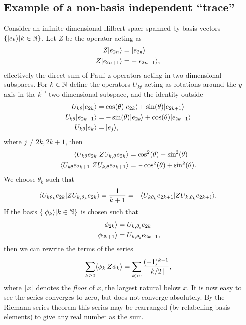\begin{subappendices}
\section{Example of a non-basis independent ``trace''}\label{app:bad-sum-is-bad}
Consider an infinite dimensional Hilbert space spanned by basis vectors $\left\{| e_k \rangle\middle|k\in\mathbb{N}\right\}$. Let $Z$ be the operator acting as
\begin{align}
  Z| e_{2n} \rangle &= | e_{2n} \rangle\\
  Z| e_{2n+1} \rangle &= -| e_{2n+1} \rangle,
\end{align}
effectively the direct sum of Pauli-z operators acting in two dimensional subspaces. For $k\in\mathbb{N}$ define the operators $U_{k\theta}$ acting as rotations around the $y$ axis in the $k^\text{th}$ two dimensional subspace, and the identity outside
\begin{align}
  U_{k\theta} | e_{2k} \rangle &= \cos(\theta) | e_{2k} \rangle + \sin(\theta)| e_{2k+1} \rangle\\
  U_{k\theta} | e_{2k+1} \rangle &= -\sin(\theta) | e_{2k} \rangle + \cos(\theta)| e_{2k+1} \rangle\\
  U_{k\theta} | e_k \rangle &= | e_j \rangle,                            
\end{align}
where $j\neq 2k, 2k+1$, then 
\begin{align}
  \langle U_{k\theta}e_{2k}|ZU_{k,\theta}e_{2k}\rangle &= \cos^2(\theta) - \sin^2(\theta)\\
  \langle U_{k\theta}e_{2k+1}|ZU_{k,\theta}e_{2k+1}\rangle &= -\cos^2(\theta) + \sin^2(\theta).
\end{align}
We choose $\theta_k$ such that 
\begin{align}
  \langle U_{k\theta_k}e_{2k}|ZU_{k,\theta_k}e_{2k}\rangle = \frac{1}{k+1} = -\langle U_{k\theta_k}e_{2k+1}|ZU_{k,\theta_k}e_{2k+1}\rangle.
\end{align}
If the basis $\left\{| \phi_k \rangle\middle|k\in\mathbb{N}\right\}$ is chosen such that 
\begin{align}
  | \phi_{2k} \rangle &= U_{k,\theta_k}e_{2k}\\
  | \phi_{2k+1} \rangle &= U_{k,\theta_k}e_{2k+1},
\end{align}
then we can rewrite the terms of the series
\begin{align}
  \sum_{k\geq 0} \langle \phi_k|Z\phi_k\rangle = \sum_{k>0}\frac{(-1)^{k-1}}{\lfloor k/2\rfloor},
\end{align}
where $\lfloor x\rfloor$ denotes the \emph{floor} of $x$, the largest natural below $x$. It is now easy to see the series converges to zero, but does not converge absolutely. By the Riemann series theorem \cite{Sierpinski1910} this series may be rearranged (by relabelling basis elements) to give any real number as the sum.

\end{subappendices}

